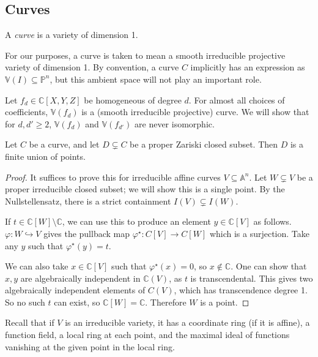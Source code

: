\subsection{Curves}
\begin{definition}
    A \emph{curve} is a variety of dimension 1.
\end{definition}
For our purposes, a curve is taken to mean a smooth irreducible projective variety of dimension 1.
By convention, a curve \( C \) implicitly has an expression as \( \mathbb V(I) \subseteq \mathbb P^n \), but this ambient space will not play an important role.
\begin{example}
    Let \( f_d \in \mathbb C[X, Y, Z] \) be homogeneous of degree \( d \).
    For almost all choices of coefficients, \( \mathbb V(f_d) \) is a (smooth irreducible projective) curve.
    We will show that for \( d, d' \geq 2 \), \( \mathbb V(f_d) \) and \( \mathbb V(f_{d'}) \) are never isomorphic.
\end{example}
\begin{proposition}
    Let \( C \) be a curve, and let \( D \subsetneq C \) be a proper Zariski closed subset.
    Then \( D \) is a finite union of points.
\end{proposition}
\begin{proof}
    It suffices to prove this for irreducible affine curves \( V \subseteq \mathbb A^n \).
    Let \( W \subsetneq V \) be a proper irreducible closed subset; we will show this is a single point.
    By the Nullstellensatz, there is a strict containment \( I(V) \subsetneq I(W) \).
    
    If \( t \in \mathbb C[W] \setminus \mathbb C \), we can use this to produce an element \( y \in \mathbb C[V] \) as follows.
    \( \varphi \colon W \hookrightarrow V \) gives the pullback map \( \varphi^\star \colon C[V] \to C[W] \) which is a surjection.
    Take any \( y \) such that \( \varphi^\star(y) = t \).

    We can also take \( x \in \mathbb C[V] \) such that \( \varphi^\star(x) = 0 \), so \( x \not\in \mathbb C \).
    One can show that \( x, y \) are algebraically independent in \( \mathbb C(V) \), as \( t \) is transcendental.
    This gives two algebraically independent elements of \( C(V) \), which has transcendence degree 1.
    So no such \( t \) can exist, so \( \mathbb C[W] = \mathbb C \).
    Therefore \( W \) is a point.
\end{proof}
Recall that if \( V \) is an irreducible variety, it has a coordinate ring (if it is affine), a function field, a local ring at each point, and the maximal ideal of functions vanishing at the given point in the local ring.
